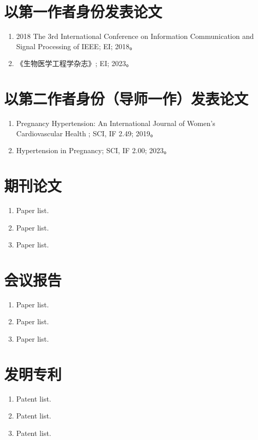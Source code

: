 \cleardoublepage
{}

{%
    \section*{以第一作者身份发表论文}
    \begin{enumerate}
        \item 2018 The 3rd International Conference on Information Communication and Signal Processing of IEEE; EI; 2018。
        \item 《生物医学工程学杂志》; EI; 2023。
    \end{enumerate}

    \section*{以第二作者身份（导师一作）发表论文}
    \begin{enumerate}
        \item Pregnancy Hypertension: An International Journal of Women's Cardiovascular Health ; SCI, IF 2.49; 2019。
        \item Hypertension in Pregnancy; SCI, IF 2.00; 2023。
    \end{enumerate}
}
{%
    \section*{期刊论文}
    \begin{enumerate}
        \item Paper list.
        \item Paper list.
        \item Paper list.
    \end{enumerate}

    \section*{会议报告}
    \begin{enumerate}
        \item Paper list.
        \item Paper list.
        \item Paper list.
    \end{enumerate}

    \section*{发明专利}
    \begin{enumerate}
        \item Patent list.
        \item Patent list.
        \item Patent list.
    \end{enumerate}
}